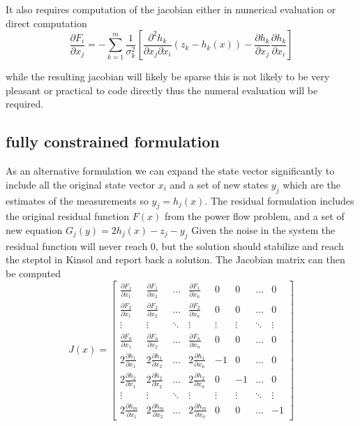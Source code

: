 \documentclass[11pt]{article} %
\newcommand{\pdiff}[2]{\frac{\partial #1}{\partial #2}}
\begin{document}
It also requires computation of the jacobian either in numerical evaluation or direct computation
\begin{equation}
\pdiff{F_i}{x_j} = -\sum_{k=1}^m\frac{1}{\sigma_k^2}\left[\frac{\partial^2 h_k}{\partial x_j \partial x_i}(z_k-h_k(x))-\pdiff{h_k}{x_j}\pdiff{h_k}{x_i}\right]
\end{equation}

while the resulting jacobian will likely be sparse this is not likely to be very pleasant or practical to code directly thus the numeral evaluation will be required.

\subsection{fully constrained formulation}
As an alternative formulation we can expand the state vector significantly to include all the original state vector $x_i$ and a set of new states $y_j$ which are the estimates of the measurements so $y_j=h_j(x)$.  The residual formulation includes the original residual function $F(x)$ from the power flow problem, and a set of new equation $G_j(y)=2h_j(x)-z_j-y_j$
Given the noise in the system the residual function will never reach 0, but the solution should stabilize and reach the steptol in Kinsol and report back a solution.
The Jacobian matrix can then be computed
\begin{equation}
J(x) = \left[
\begin{matrix}
\pdiff{F_1}{x_1} & \pdiff{F_1}{x_2} & \hdots & \pdiff{F_1}{x_n} & 0 & 0 &\hdots & 0 \\
\pdiff{F_2}{x_1} & \pdiff{F_2}{x_2} & \hdots & \pdiff{F_2}{x_n} & 0 & 0 & \hdots & 0 \\
\vdots & \vdots & \ddots & \vdots & \vdots & \vdots & \ddots & \vdots \\
\pdiff{F_n}{x_1} & \pdiff{F_n}{x_2} & \hdots & \pdiff{F_n}{x_n} & 0 & 0 & \hdots & 0 \\
2\pdiff{h_1}{x_1} & 2\pdiff{h_1}{x_2} & \hdots &2 \pdiff{h_1}{x_n} & -1 & 0 &\hdots &0\\
2\pdiff{h_2}{x_1} &2 \pdiff{h_2}{x_2} & \hdots & 2\pdiff{h_2}{x_n} & 0 & -1  &\hdots &0\\
\vdots & \vdots & \ddots & \vdots &\vdots & \vdots  & \ddots & \vdots\\
2\pdiff{h_m}{x_1} &2 \pdiff{h_m}{x_2} & \hdots & 2\pdiff{h_m}{x_n} & 0 & 0 & \hdots &  -1

\end{matrix}
\right]
\end{equation}
\end{document}
